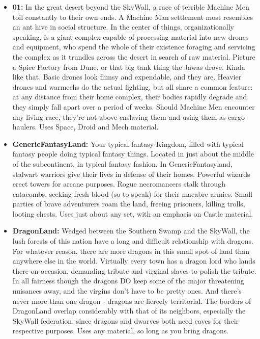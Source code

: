 \documentclass[12pt,a4paper,twocolumn]{article}
\begin{document}
\begin{itemize}
\item {\bf 01:} In the great desert beyond the SkyWall, a race of terrible Machine Men toil constantly to their own ends.  A Machine Man settlement most resembles an ant hive in social structure.  In the center of things, organizationally speaking, is a giant complex capable of processing material into new drones and equipment, who spend the whole of their existence foraging and servicing the complex as it trundles across the desert in search of raw material.  Picture a Spice Factory from Dune, or that big tank thing the Jawas drove.  Kinda like that.  Basic drones look flimsy and expendable, and they are.  Heavier drones and warmechs do the actual fighting, but all share a common feature: at any distance from their home complex, their bodies rapidly degrade and they simply fall apart over a period of weeks.  Should Machine Men encounter any living race, they're not above enslaving them and using them as cargo haulers.  Uses Space, Droid and Mech material.

\item {\bf GenericFantasyLand:} Your typical fantasy Kingdom, filled with typical fantasy people doing typical fantasy things.  Located in just about the middle of the subcontinent, in typical fantasy fashion.  In GenericFantasyland, stalwart warriors give their lives in defense of their homes.  Powerful wizards erect towers for arcane purposes.  Rogue necromancers stalk through catacombs, seeking fresh blood (so to speak) for their macabre armies.  Small parties of brave adventurers roam the land, freeing prisoners, killing trolls, looting chests.  Uses just about any set, with an emphasis on Castle material.

\item {\bf DragonLand:} Wedged between the Southern Swamp and the SkyWall, the lush forests of this nation have a long and difficult relationship with dragons.  For whatever reason, there are more dragons in this small spot of land than anywhere else in the world.  Virtually every town has a dragon lord who lands there on occasion, demanding tribute and virginal slaves to polish the tribute.  In all fairness though the dragons DO keep some of the major threatening nuisances away, and the virgins don't have to be pretty ones.  And there's never more than one dragon - dragons are fiercely territorial.  The borders of DragonLand overlap considerably with that of its neighbors, especially the SkyWall federation, since dragons and dwarves both need caves for their respective purposes.  Uses any material, so long as you bring dragons. 


\end{itemize}
\end{document}
